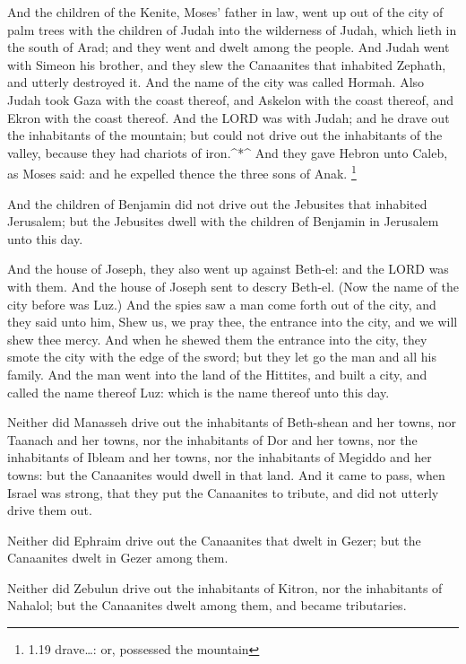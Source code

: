  And the children of the Kenite, Moses' father in law, went
up out of the city of palm trees with the children of Judah into the
wilderness of Judah, which lieth in the south of Arad; and they went and
dwelt among the people.  And Judah went with Simeon his
brother, and they slew the Canaanites that inhabited Zephath, and
utterly destroyed it. And the name of the city was called Hormah.
 Also Judah took Gaza with the coast thereof, and Askelon
with the coast thereof, and Ekron with the coast thereof. 
And the LORD was with Judah; and he drave out the inhabitants of the
mountain; but could not drive out the inhabitants of the valley, because
they had chariots of iron.\^{}*\^{}  And they gave Hebron
unto Caleb, as Moses said: and he expelled thence the three sons of
Anak. \footnote{1.19 drave\ldots: or, possessed the mountain}

 And the children of Benjamin did not drive out the
Jebusites that inhabited Jerusalem; but the Jebusites dwell with the
children of Benjamin in Jerusalem unto this day.

 And the house of Joseph, they also went up against
Beth-el: and the LORD was with them.  And the house of
Joseph sent to descry Beth-el. (Now the name of the city before was
Luz.)  And the spies saw a man come forth out of the city,
and they said unto him, Shew us, we pray thee, the entrance into the
city, and we will shew thee mercy.  And when he shewed them
the entrance into the city, they smote the city with the edge of the
sword; but they let go the man and all his family.  And the
man went into the land of the Hittites, and built a city, and called the
name thereof Luz: which is the name thereof unto this day.

 Neither did Manasseh drive out the inhabitants of
Beth-shean and her towns, nor Taanach and her towns, nor the inhabitants
of Dor and her towns, nor the inhabitants of Ibleam and her towns, nor
the inhabitants of Megiddo and her towns: but the Canaanites would dwell
in that land.  And it came to pass, when Israel was strong,
that they put the Canaanites to tribute, and did not utterly drive them
out.

 Neither did Ephraim drive out the Canaanites that dwelt in
Gezer; but the Canaanites dwelt in Gezer among them.

 Neither did Zebulun drive out the inhabitants of Kitron,
nor the inhabitants of Nahalol; but the Canaanites dwelt among them, and
became tributaries.

